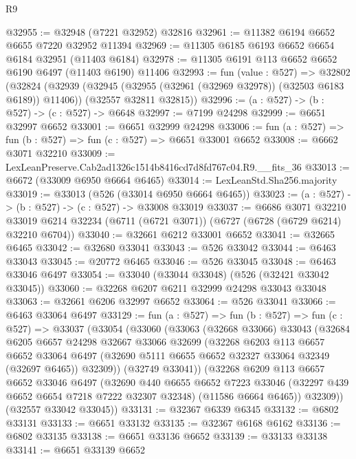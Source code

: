 \begin{lexlean}{R9}
\begin{coremodule}
@32955 := @32948 (@7221 @32952) @32816
@32961 := @11382 @6194 @6652 @6655 @7220 @32952 @11394
@32969 := @11305 @6185 @6193 @6652 @6654 @6184 @32951 (@11403 @6184)
@32978 := @11305 @6191 @113 @6652 @6652 @6190 @6497 (@11403 @6190) @11406
@32993 := fun (value : @527) =>
  @32802
    (@32824
      (@32939 (@32945 (@32955 (@32961 (@32969 @32978)) (@32503 @6183 @6189)) @11406))
      (@32557 @32811 @32815))
@32996 := (a : @527) -> (b : @527) -> (c : @527) -> @6648
@32997 := @7199 @24298
@32999 := @6651 @32997 @6652
@33001 := @6651 @32999 @24298
@33006 := fun (a : @527) => fun (b : @527) => fun (c : @527) => @6651 @33001 @6652
@33008 := @6662 @3071 @32210
@33009 := LexLeanPreserve.Cab2ad1326c1514b8416cd7d8fd767c04.R9.__fits_36
@33013 := @6672 (@33009 @6950 @6664 @6465)
@33014 := LexLeanStd.Sha256.majority
@33019 := @33013 (@526 (@33014 @6950 @6664 @6465))
@33023 := (a : @527) -> (b : @527) -> (c : @527) -> @33008 @33019
@33037 := @6686
    @3071
    @32210
    @33019
    @6214
    @32234
    (@6711 (@6721 @3071))
    (@6727 (@6728 (@6729 @6214) @32210 @6704))
@33040 := @32661 @6212 @33001 @6652
@33041 := @32665 @6465
@33042 := @32680 @33041
@33043 := @526 @33042
@33044 := @6463 @33043
@33045 := @20772 @6465
@33046 := @526 @33045
@33048 := @6463 @33046 @6497
@33054 := @33040 (@33044 @33048) (@526 (@32421 @33042 @33045))
@33060 := @32268 @6207 @6211 @32999 @24298 @33043 @33048
@33063 := @32661 @6206 @32997 @6652
@33064 := @526 @33041
@33066 := @6463 @33064 @6497
@33129 := fun (a : @527) =>
  fun (b : @527) =>
  fun (c : @527) =>
  @33037
    (@33054
      (@33060
        (@33063
          (@32668 @33066)
          @33043
          (@32684
            @6205
            @6657
            @24298
            @32667
            @33066
            @32699
            (@32268
              @6203
              @113
              @6657
              @6652
              @33064
              @6497
              (@32690 @5111 @6655 @6652 @32327 @33064 @32349 (@32697 @6465))
              @32309))
          (@32749 @33041))
        (@32268
          @6209
          @113
          @6657
          @6652
          @33046
          @6497
          (@32690
            @440
            @6655
            @6652
            @7223
            @33046
            (@32297 @439 @6652 @6654 @7218 @7222 @32307 @32348)
            (@11586 @6664 @6465))
          @32309))
      (@32557 @33042 @33045))
@33131 := @32367 @6339 @6345
@33132 := @6802 @33131
@33133 := @6651 @33132
@33135 := @32367 @6168 @6162
@33136 := @6802 @33135
@33138 := @6651 @33136 @6652
@33139 := @33133 @33138
@33141 := @6651 @33139 @6652

\end{coremodule}
\end{lexlean}
